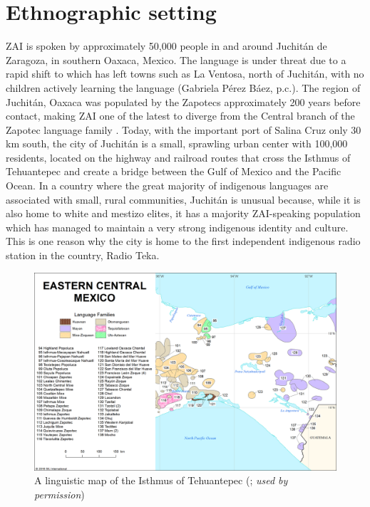 \section{Ethnographic setting}

ZAI is spoken by approximately 50,000 people in and around Juchit\'{a}n de Zaragoza, in southern Oaxaca, Mexico. The language is under threat due to a rapid shift to  which has left towns such as La Ventosa, north of Juchit\'{a}n, with no children actively learning the language (Gabriela P\'{e}rez B\'{a}ez, p.c.). The region of Juchit\'{a}n, Oaxaca was populated by the Zapotecs approximately 200 years before  contact, making ZAI one of the latest to diverge from the Central branch of the Zapotec language family \citep{rendon1995}. Today, with the important port of Salina Cruz only 30 km south, the city of Juchit\'{a}n is a small, sprawling urban center with 100,000 residents, located on the highway and railroad routes that cross the Isthmus of Tehuantepec and create a bridge between the Gulf of Mexico and the Pacific Ocean. In a country where the great majority of indigenous languages are associated with small, rural communities, Juchit\'{a}n is unusual because, while it is also home to white and mestizo elites, it has a majority ZAI-speaking population which has managed to maintain a very strong indigenous identity and culture. This is one reason why the city is home to the first independent indigenous radio station in the country, Radio Teka. 



\begin{figure}
\includegraphics[height=.4\textheight]{mapa3.png}
\caption{\small{A linguistic map of the Isthmus of Tehuantepec (\cite{lewis2016}; \textit{used by permission})}}
\end{figure}


